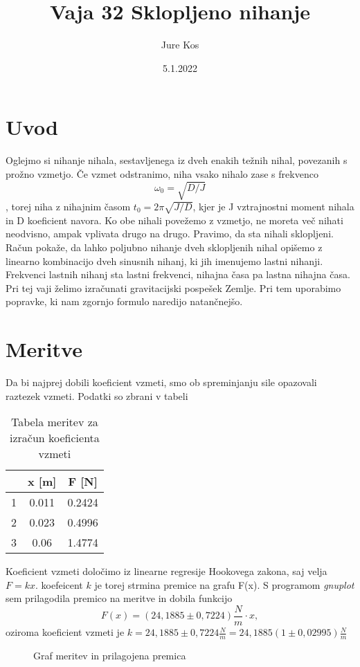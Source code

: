 \documentclass[a4paper]{report}
\begin{document}
\title{Vaja 32 Sklopljeno nihanje}
\author{Jure Kos }
\date {5.1.2022}
\maketitle


\chapter*{Uvod}
Oglejmo si nihanje nihala, sestavljenega iz dveh enakih težnih nihal, povezanih s prožno vzmetjo. Če vzmet odstranimo, niha vsako nihalo zase s frekvenco $$
\omega_0 = \sqrt{D/J}$$, torej niha z
nihajnim časom $t_0 = 2\pi \sqrt{J/D}$, kjer je J vztrajnostni moment nihala in D koeficient
navora. Ko obe nihali povežemo z vzmetjo, ne moreta več nihati neodvisno, ampak
vplivata drugo na drugo. Pravimo, da sta nihali sklopljeni. Račun pokaže, da
lahko poljubno nihanje dveh sklopljenih nihal opišemo z linearno kombinacijo dveh
sinusnih nihanj, ki jih imenujemo lastni nihanji. Frekvenci lastnih nihanj sta lastni
frekvenci, nihajna časa pa lastna nihajna časa.
Pri tej vaji želimo izračunati gravitacijski pospešek Zemlje. Pri tem uporabimo popravke, ki nam zgornjo formulo naredijo natančnejšo.
\\


\chapter*{Meritve}
Da bi najprej dobili koeficient vzmeti, smo ob spreminjanju sile opazovali raztezek vzmeti. Podatki so zbrani v tabeli\\
\begin{table}[H]
    \centering
    \begin{tabular}{c|c|c}
         &x [m]&F [N]  \\
         \hline
 1&        0.011&	0.2424\\
2&0.023&	0.4996\\
3&0.06&	1.4774\\
    \end{tabular}
    \caption{Tabela meritev za izračun koeficienta vzmeti}
    \label{tab:my_label}
\end{table}
Koeficient vzmeti določimo iz linearne regresije Hookovega zakona, saj velja $F=kx$. koefeicent $k$ je torej strmina premice na grafu F(x). S programom \textit{gnuplot} sem prilagodila premico na meritve in dobila funkcijo
$$F(x) = (24,1885 \pm 0,7224) \frac{N}{m} \cdot x,
$$ oziroma koeficient vzmeti je $ k = 24,1885 \pm 0,7224 \frac{N}{m} = 24,1885 (1 \pm 0,02995) \frac{N}{m} $
 \begin{figure}[H]
     \centering
     \caption{Graf meritev in prilagojena premica}
     \label{fig:my_label}
 \end{figure}
\end{document}
